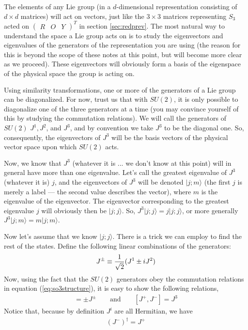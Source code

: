 \documentclass[12pt,epsf]{article}
\begin{document}
The elements of any Lie group (in a $d$-dimensional representation
consisting of $d\times d$ matrices) will act on vectors, just like the
$3\times 3$ matrices representing $S_3$ acted on $\begin{pmatrix} R & O
& Y \end{pmatrix}^T$ in section \ref{sec:redprev}.  The most natural
way to understand the space a Lie group acts on is to study the
eigenvectors and eigenvalues of the generators of the representation
you are using (the reason for this is beyond the scope of these notes
at this point, but will become more clear as we proceed).  These
eigenvectors will obviously form a basis of the eigenspace of the
physical space the group is acting on.	

Using similarity transformations, one or more of the generators of a
Lie group can be diagonalized.	For now, trust us that with $SU(2)$, it
is only possible to diagonalize one of the three generators at a time
(you may convince yourself of this by studying the commutation
relations).  We will call the generators of $SU(2)$ $J^1, J^2$, and
$J^3$, and by convention we take $J^3$ to be the diagonal one.	So,
consequently, the eigenvectors of $J^3$ will be the basis vectors of
the physical vector space upon which $SU(2)$ acts.  

Now, we know that $J^3$ (whatever it is ... we don't know at this
point) will in general have more than one eigenvalue.  Let's call the
greatest eigenvalue of $J^3$ (whatever it is) $j$, and the eigenvectors
of $J^3$ will be denoted $|j;m\rangle$ (the first $j$ is merely a label
--- the second value describes the vector), where $m$ is the eigenvalue
of the eigenvector.  The eigenvector corresponding to the greatest
eigenvalue $j$ will obviously then be $|j;j\rangle$.  So,
$J^3|j;j\rangle = j|j;j\rangle$, or more generally $J^3|j;m\rangle =
m|j;m\rangle$.	

Now let's assume that we know $|j;j\rangle$.  There is a trick we can
employ to find the rest of the states.	Define the following linear
combinations of the generators:
\begin{eqnarray}
J^{\pm} \equiv {1\over \sqrt{2}}(J^1 \pm i J^2) \label{eq:jpjm}
\end{eqnarray}
Now, using the fact that the $SU(2)$ generators obey the commutation
relations in equation (\ref{eq:so3structure}), it is easy to show the
following relations, 
\begin{eqnarray}
[J^2,J^{\pm}] = \pm J^{\pm} \qquad \mbox{and} \qquad [J^+,J^-] = J^3
\label{eq:pmcom}
\end{eqnarray}
Notice that, because by definition $J^i$ are all Hermitian, we have 
\begin{eqnarray}
(J^-)^{\dagger} = J^+ \label{eq:daggerplus}
\end{eqnarray}
\end{document}
